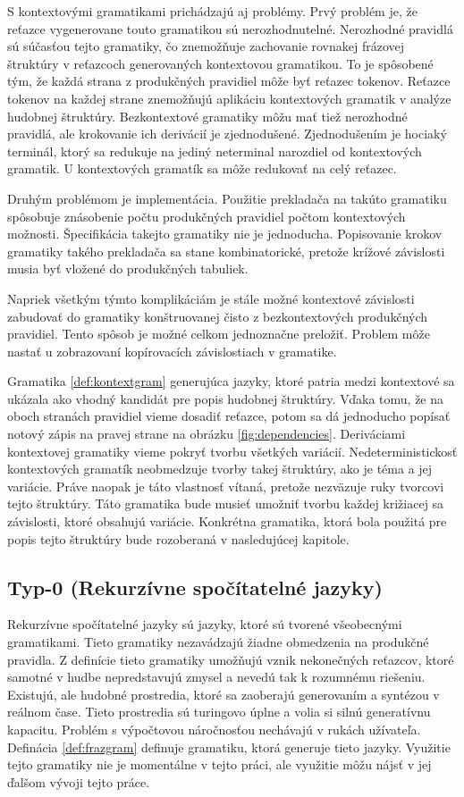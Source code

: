 S kontextovými gramatikami prichádzajú aj problémy. Prvý problém je, že reťazce vygenerovane touto gramatikou sú nerozhodnutelné. Nerozhodné pravidlá sú súčasťou tejto gramatiky, čo znemožňuje zachovanie rovnakej frázovej štruktúry v reťazcoch generovaných kontextovou gramatikou. To je spôsobené tým, že každá strana z produkčných pravidiel môže byť reťazec tokenov. Reťazce tokenov na každej strane znemožňujú aplikáciu kontextových gramatik v analýze hudobnej štruktúry. Bezkontextové gramatiky môžu mať tiež nerozhodné pravidlá, ale krokovanie ich derivácií je zjednodušené. Zjednodušením je hociaký terminál, ktorý sa redukuje na jediný neterminal narozdiel od kontextových gramatik. U kontextových gramatík sa môže redukovať na celý reťazec.

Druhým problémom je implementácia. Použitie prekladača na takúto gramatiku spôsobuje znásobenie počtu produkčných pravidiel počtom kontextových možnosti. Špecifikácia takejto gramatiky nie je jednoducha. Popisovanie krokov gramatiky takého prekladača sa stane kombinatorické, pretože krížové závislosti musia byť vložené do produkčných tabuliek.

Napriek všetkým týmto komplikáciám je stále možné kontextové závislosti zabudovať do gramatiky konštruovanej čisto z bezkontextových produkčných pravidiel. Tento spôsob je možné celkom jednoznačne preložiť. Problem môže nastať u zobrazovaní kopírovacích závislostiach v gramatike.

Gramatika \ref{def:kontextgram} generujúca jazyky, ktoré patria medzi kontextové sa ukázala ako vhodný kandidát pre popis hudobnej štruktúry. Vďaka tomu, že na oboch stranách pravidiel vieme dosadiť reťazce, potom sa dá jednoducho popísať notový zápis na pravej strane na obrázku \ref{fig:dependencies}. Deriváciami kontextovej gramatiky vieme pokryť tvorbu všetkých variácií. Nedeterministickosť kontextových gramatík neobmedzuje tvorby takej štruktúry, ako je téma a jej variácie. Práve naopak je táto vlastnosť vítaná, pretože nezväzuje ruky tvorcovi tejto štruktúry. Táto gramatika bude musieť umožniť tvorbu každej križiacej sa závislosti, ktoré obsahujú variácie. Konkrétna gramatika, ktorá bola použitá pre popis tejto štruktúry bude rozoberaná v nasledujúcej kapitole.

\subsection*{Typ-0 (Rekurzívne spočítatelné jazyky)}
Rekurzívne spočítatelné jazyky sú jazyky, ktoré sú tvorené všeobecnými gramatikami. Tieto gramatiky nezavádzajú žiadne obmedzenia na produkčné pravidla. Z definície tieto gramatiky umožňujú vznik nekonečných reťazcov, ktoré samotné v hudbe nepredstavujú zmysel a nevedú tak k rozumnému riešeniu. Existujú, ale hudobné prostredia, ktoré sa zaoberajú generovaním a syntézou v reálnom čase. Tieto prostredia sú turingovo úplne a volia si silnú generatívnu kapacitu. Problém s výpočtovou náročnosťou nechávajú v rukách užívateľa. Definácia \ref{def:frazgram} definuje gramatiku, ktorá generuje tieto jazyky. Využitie tejto gramatiky nie je momentálne v tejto práci, ale využitie môžu nájsť v jej ďalšom vývoji tejto práce.

